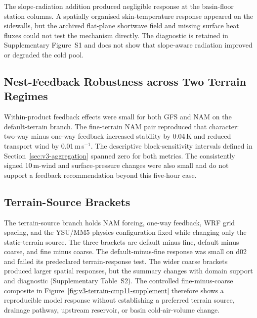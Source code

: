 \documentclass[air,article,submit,moreauthors]{Definitions/mdpi}
\begin{document}
The slope-radiation addition produced negligible response at the basin-floor station columns.
A spatially organised skin-temperature response appeared on the sidewalls, but the archived flat-plane shortwave field and missing surface heat fluxes could not test the mechanism directly.
The diagnostic is retained in Supplementary Figure~S1 and does not show that slope-aware radiation improved or degraded the cold pool.

\subsection{Nest-Feedback Robustness across Two Terrain Regimes}
\label{sec:v3-feedback}

\label{sec:v3-cmp06}
Within-product feedback effects were small for both GFS and NAM on the default-terrain branch.
The fine-terrain NAM pair reproduced that character: two-way minus one-way feedback increased stability by 0.04\,K and reduced transport wind by 0.01\,m\,s$^{-1}$.
The descriptive block-sensitivity intervals defined in Section~\ref{sec:v3-aggregation} spanned zero for both metrics.
The consistently signed 10\,m-wind and surface-pressure changes were also small and do not support a feedback recommendation beyond this five-hour case.

\subsection{Terrain-Source Brackets}
\label{sec:v3-terrain}

The terrain-source branch holds NAM forcing, one-way feedback, WRF grid spacing, and the YSU/MM5 physics configuration fixed while changing only the static-terrain source.
The three brackets are default minus fine, default minus coarse, and fine minus coarse.
The default-minus-fine response was small on d02 and failed its predeclared terrain-response test.
The wider coarse brackets produced larger spatial responses, but the summary changes with domain support and diagnostic (Supplementary Table~S2).
The controlled fine-minus-coarse composite in Figure~\ref{fig:v3-terrain-cmp11-supplement} therefore shows a reproducible model response without establishing a preferred terrain source, drainage pathway, upstream reservoir, or basin cold-air-volume change.
\end{document}
